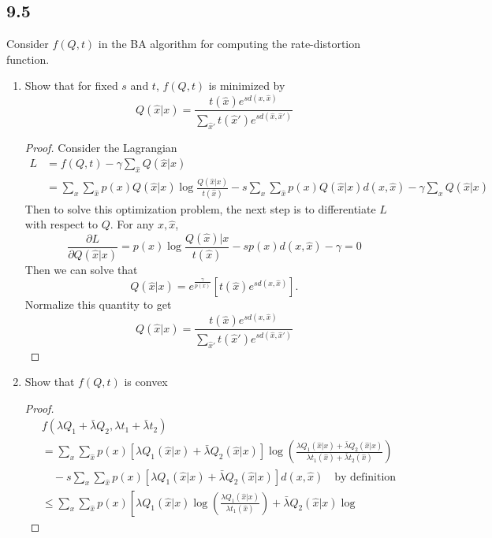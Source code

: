 \documentclass[../main.tex]{subfiles}
\begin{document}
\subsection*{9.5}
Consider $f(Q,t)$ in the BA algorithm for computing the rate-distortion function.\begin{enumerate}[label=\alph*]
    \item Show that for fixed $s$ and $t$, $f(Q,t)$ is minimized by \[
    Q(\hat x| x) = \frac{t(\hat x)e^{sd(x,\hat x)}}{\sum_{\hat x'}t(\hat x')e^{sd(\hat x,\hat x')}}
    \]
    \begin{proof}
        Consider the Lagrangian \begin{align*}
            L &= f(Q,t)-\gamma \sum_{\hat x}Q(\hat x|x)\\
            &=\sum_x\sum_{\hat x}p(x)Q(\hat x|x)\log\frac{Q(\hat x|x)}{t(\hat x)}-s\sum_x\sum_{\hat x}p(x)Q(\hat x|x)d(x,\hat x)- \gamma\sum_xQ(\hat x|x)
        \end{align*}
    Then to solve this optimization problem, the next step is to differentiate $L$ with respect to $Q$. For any $x,\hat x$, \[
    \frac{\partial L}{\partial Q(\hat x|x)}=p(x)\log\frac{Q(\hat x)|x}{t(\hat x)}-sp(x)d(x,\hat x)-\gamma = 0
    \]
    Then we can solve that \[
    Q(\hat x|x)=e^{\frac{\gamma}{p(x)}}[t(\hat x)e^{sd(x,\hat x)}].
    \] Normalize this quantity to get \[
    Q(\hat x| x) = \frac{t(\hat x)e^{sd(x,\hat x)}}{\sum_{\hat x'}t(\hat x')e^{sd(\hat x,\hat x')}}
    \]
    \end{proof}
    \item Show that $f(Q,t)$ is convex
    \begin{proof}
        \begin{align*}
    &f(\lambda Q_1 + \bar{\lambda} Q_2, \lambda t_1 + \bar{\lambda} t_2)\\
    &= \sum_x \sum_{\hat{x}} p(x) 
    \left[ 
        \lambda Q_1(\hat{x}|x) + \bar{\lambda} Q_2(\hat{x}|x)
    \right] 
    \log \left( 
        \frac{\lambda Q_1(\hat{x}|x) + \bar{\lambda} Q_2(\hat{x}|x)}{\lambda t_1(\hat{x}) + \bar{\lambda} t_2(\hat{x})} 
    \right) \\
    &\quad - s \sum_x \sum_{\hat{x}} p(x) 
    \left[ 
        \lambda Q_1(\hat{x}|x) + \bar{\lambda} Q_2(\hat{x}|x) 
    \right] 
    d(x, \hat{x}) \quad \text{by definition}\\
    &\leq \sum_x \sum_{\hat{x}} p(x) 
    \left[ 
        \lambda Q_1(\hat{x}|x) \log 
        \left( 
            \frac{\lambda Q_1(\hat{x}|x)}{\lambda t_1(\hat{x})} 
        \right) 
        + \bar{\lambda} Q_2(\hat{x}|x) \log 

\end{align*}
\end{proof}
\end{enumerate}
\end{document}
